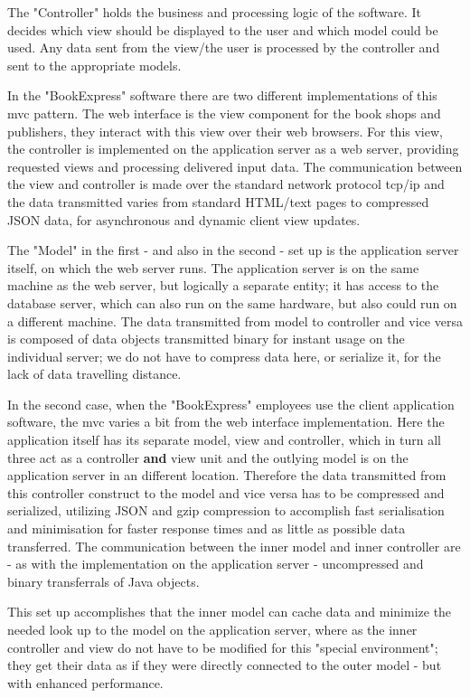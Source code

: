 \documentclass[11pt,a4paper,oneside,svgnames]{report}
\begin{document}
The "Controller" holds the business and processing logic of the software. It decides which view should be displayed to the user and which model could be used. Any data sent from the view/the user is processed by the controller and sent to the appropriate models.

In the "BookExpress" software there are two different implementations of this \gls{mvc} pattern. The web interface is the view component for the book shops and publishers, they interact with this view over their web browsers.
For this view, the controller is implemented on the application server as a web server, providing requested views and processing delivered input data. The communication between the view and controller is made over the standard network protocol tcp/ip and the data transmitted varies from standard HTML/text pages to compressed JSON data, for asynchronous and dynamic client view updates.

The "Model" in the first - and also in the second - set up is the application server itself, on which the web server runs. The application server is on the same machine as the web server, but logically a separate entity; it has access to the database server, which can also run on the same hardware, but also could run on a different machine. The data transmitted from model to controller and vice versa is composed of data objects transmitted binary for instant usage on the individual server; we do not have to compress data here, or serialize it, for the lack of data travelling distance.

In the second case, when the "BookExpress" employees use the client application software, the \gls{mvc} varies a bit from the web interface implementation. Here the application itself has its separate model, view and controller, which in turn all three act as a controller \textbf{and} view unit and the outlying model is on the application server in an different location. Therefore the data transmitted from this controller construct to the model and vice versa has to be compressed and serialized, utilizing JSON and gzip compression to accomplish fast serialisation and minimisation for faster response times and as little as possible data transferred. The communication between the inner model and inner controller are - as with the implementation on the application server - uncompressed and binary transferrals of Java objects.

This set up accomplishes that the inner model can cache data and minimize the needed look up to the model on the application server, where as the inner controller and view do not have to be modified for this "special environment"; they get their data as if they were directly connected to the outer model - but with enhanced performance.
\end{document}
